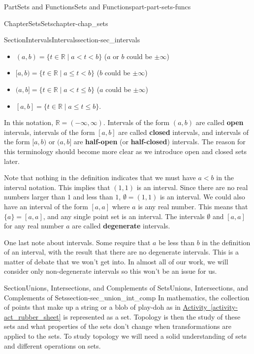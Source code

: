 \documentclass[oneside,10pt,]{book}
\newcommand{\xreffont}{\relax}
\newcommand{\terminology}[1]{\textbf{#1}}
\numberwithin{equation}{chapter}
\newcommand{\R}{\mathbb{R}}
\newcommand{\lt}{<}
\begin{document}
\begin{partptx}{Part}{Sets and Functions}{}{Sets and Functions}{}{}{part-part-sets-funcs}
\begin{chapterptx}{Chapter}{Sets}{}{Sets}{}{}{chapter-chap_sets}
\begin{sectionptx}{Section}{Intervals}{}{Intervals}{}{}{section-sec_intervals}
\begin{itemize}[label=\textbullet]
\item{}\((a,b) = \{t \in \R \mid a \lt t \lt b\}\) (\(a\) or \(b\) could be \(\pm \infty\))%
\item{}\([a,b) = \{t \in \R \mid a \leq t \lt b\}\) (\(b\) could be \(\pm \infty\))%
\item{}\((a,b] = \{t \in \R \mid a \lt t \leq b\}\) (\(a\) could be \(\pm \infty\))%
\item{}\([a,b] = \{t \in \R \mid a \leq t \leq b\}\).%
\end{itemize}
%
\par
In this notation, \(\R = (-\infty, \infty)\). Intervals of the form \((a,b)\) are called \terminology{open} intervals, intervals of the form \([a,b]\) are called \terminology{closed} intervals, and intervals of the form \([a,b)\) or \((a,b]\) are \terminology{half-open} (or \terminology{half-closed}) intervals. The reason for this terminology should become more clear as we introduce open and closed sets later.%
\par
Note that nothing in the definition indicates that we must have \(a \lt b\) in the interval notation. This implies that \((1,1)\) is an interval. Since there are no real numbers larger than \(1\) and less than \(1\), \(\emptyset = (1,1)\) is an interval. We could also have an interval of the form \([a,a]\) where \(a\) is any real number. This means that \(\{a\} = [a,a]\), and any single point set is an interval. The intervals \(\emptyset\) and \([a,a]\) for any real number \(a\) are called \terminology{degenerate} intervals.%
\par
One last note about intervals. Some require that \(a\) be less than \(b\) in the definition of an interval, with the result that there are no degenerate intervals. This is a matter of debate that we won't get into. In almost all of our work, we will consider only non-degenerate intervals so this won't be an issue for us.%
\end{sectionptx}
%
%
\typeout{************************************************}
\typeout{************************************************}
%
\begin{sectionptx}{Section}{Unions, Intersections, and Complements of Sets}{}{Unions, Intersections, and Complements of Sets}{}{}{section-sec_union_int_comp}
In mathematics, the collection of points that make up a string or a blob of play-doh as in \hyperref[activity-act_rubber_sheet]{Activity~{\xreffont\ref{activity-act_rubber_sheet}}} is represented as a set. Topology is then the study of these sets and what properties of the sets don't change when transformations are applied to the sets. To study topology we will need a solid understanding of sets and different operations on sets.%

\end{sectionptx}
\end{chapterptx}
\end{partptx}
\end{document}
